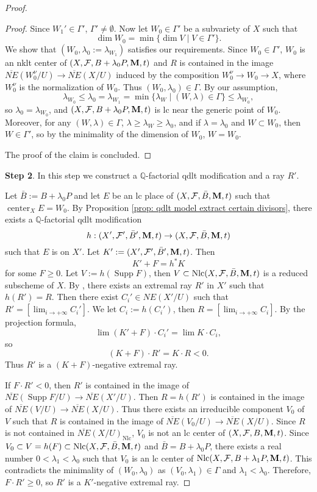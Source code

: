 \documentclass[12pt]{amsart}
\numberwithin{equation}{section}
\newcommand{\Mm}{{\bf{M}}}
\newcommand{\Qq}{\mathbb{Q}}
\newcommand{\Center}{\operatorname{center}}
\newcommand{\Supp}{\operatorname{Supp}}
\newcommand{\Nlc}{\operatorname{Nlc}}
\newcommand{\Ff}{\mathcal{F}}
\newcommand{\Ii}{\Gamma}
\theoremstyle{definition}
\theoremstyle{definition}
\theoremstyle{definition}
\begin{document}
\begin{proof}
\begin{proof}
Since $W_1'\in\Ii'$, $\Ii'\not=\emptyset$. Now let $W_0\in\Ii'$ be a subvariety of $X$ such that
$$\dim W_0=\min\{\dim V\mid V\in\Ii'\}.$$
We show that $(W_0,\lambda_0:=\lambda_{W_1})$ satisfies our requirements. Since $W_0\in\Ii'$, $W_0$ is an nklt center of $(X,\Ff,B+\lambda_{0}P,\Mm,t)$ and $R$ is contained in the image $\overline{NE}(W_0^\nu/U)\rightarrow\overline{NE}(X/U)$ induced by the composition $W_0^\nu\rightarrow W_0\rightarrow X$, where $W_0^\nu$ is the normalization of $W_0$. Thus $(W_0,\lambda_0)\in\Ii$. By our assumption,
$$\lambda_{W_0}\leq\lambda_0=\lambda_{W_1}=\min\{\lambda_W\mid (W,\lambda)\in\Ii\}\leq\lambda_{W_0},$$
so $\lambda_0=\lambda_{W_0}$, and  $(X,\Ff,B+\lambda_{0}P,\Mm,t)$ is lc near the generic point of $W_0$. Moreover, for any $(W,\lambda)\in\Ii$, $\lambda\geq\lambda_W\geq\lambda_0$, and if $\lambda=\lambda_0$ and  $W\subset W_0$, then $W\in\Ii'$, so by the minimality of the dimension of $W_0$, $W=W_0$. 

The proof of the claim is concluded.
\end{proof}

\noindent\textbf{Step 2}. In this step we construct a $\Qq$-factorial qdlt modification and a ray $R'$.

Let $\bar B:=B+\lambda_0P$ and let $E$ be an lc place of $(X,\Ff,\bar B,\Mm,t)$ such that $\Center_XE=W_0$. By Proposition \ref{prop: qdlt model extract certain divisors}, there exists a $\Qq$-factorial qdlt modification 
$$h: (X',\Ff',\bar B',\Mm,t)\rightarrow (X,\Ff,\bar B,\Mm,t)$$
such that $E$ is on $X'$. Let $K':=(X',\Ff',\bar B',\Mm,t)$. Then
$$K'+F=h^\ast K$$
for some $F\geq 0$. Let $V:=h(\Supp F)$, then $V\subset\Nlc(X,\Ff,\bar B,\Mm,t)$ is a reduced subscheme of $X$. By \cite[Lemma 8.2.3]{CHLX23}, there exists an extremal ray $R'$ in $X'$ such that $h(R')=R$. Then there exist $C_i'\in NE(X'/U)$ such that $R'=[\lim_{i\rightarrow+\infty} C_i']$. We let $C_i:=h(C_i')$, then $R=[\lim_{i\rightarrow+\infty} C_{i}]$. By the projection formula,
$$\lim (K'+F)\cdot C_{i}'=\lim K\cdot C_i,$$
so
$$(K+F)\cdot R'=K\cdot R<0.$$
Thus $R'$ is a $(K+F)$-negative extremal ray. 

If $F\cdot R'<0$, then $R'$ is contained in the image of $\overline{NE}(\Supp F/U)\rightarrow\overline{NE}(X'/U)$. Then $R=h(R')$ is contained in the image of $\overline{NE}(V/U)\rightarrow\overline{NE}(X/U)$. Thus there exists an irreducible component $V_0$ of $V$ such that $R$ is contained in the image of $\overline{NE}(V_0/U)\rightarrow\overline{NE}(X/U)$.  Since $R$ is not contained in $\overline{NE}(X/U)_{\Nlc}$, $V_0$ is not an lc center of $(X,\Ff,B,\Mm,t)$. Since $V_0\subset V=h(F)\subset\Nlc(X,\Ff,\bar B,\Mm,t)$ and $\bar B=B+\lambda_0P$, there exists a real number $0<\lambda_1<\lambda_0$ such that $V_0$ is an lc center of $\Nlc(X,\Ff,B+\lambda_1P,\Mm,t)$. This contradicts the minimality of $(W_0,\lambda_0)$ as $(V_0,\lambda_1)\in\Ii$ and $\lambda_1<\lambda_0$. Therefore, $F\cdot R'\geq 0$, so $R'$ is a  $K'$-negative extremal ray.


\end{proof}
\end{document}
